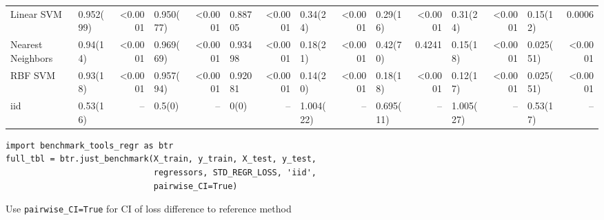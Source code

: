\documentclass[a0,landscape]{a0poster}
\newcommand{\code}{\texttt}
\begin{document}
\begin{multicols}{2}
\begin{center}
{\begin{tabular}{|l|l|r|l|r|l|r|l|r|l|r|l|r|l|r|}
Linear SVM        &  0.952(99) &  <0.0001 &  0.950(77) &  <0.0001 &  0.88705 &  <0.0001 &  0.34(24)  &  <0.0001 &    0.29(16)  &  <0.0001 &  0.31(24)  &  <0.0001 &  0.15(12)  &   0.0006 \\
Nearest Neighbors &  0.94(14)  &  <0.0001 &  0.969(69) &  <0.0001 &  0.93498 &  <0.0001 &  0.18(21)  &  <0.0001 &    0.42(70)  &   0.4241 &  0.15(18)  &  <0.0001 &  0.025(51) &  <0.0001 \\
RBF SVM           &  0.93(18)  &  <0.0001 &  0.957(94) &  <0.0001 &  0.92081 &  <0.0001 &  0.14(20)  &  <0.0001 &    0.18(18)  &  <0.0001 &  0.12(17)  &  <0.0001 &  0.025(51) &  <0.0001 \\
iid               &  0.53(16)  &     {--} &  0.5(0)    &     {--} &  0(0)    &     {--} &  1.004(22) &     {--} &    0.695(11) &     {--} &  1.005(27) &     {--} &  0.53(17)  &     {--} \\
\bottomrule
\end{tabular}
}
\end{center}
\begin{verbatim}
import benchmark_tools_regr as btr
full_tbl = btr.just_benchmark(X_train, y_train, X_test, y_test,
                              regressors, STD_REGR_LOSS, 'iid',
                              pairwise_CI=True)
\end{verbatim}
Use \code{pairwise\_CI=True} for CI of loss difference to reference method


\end{multicols}
\end{document}
